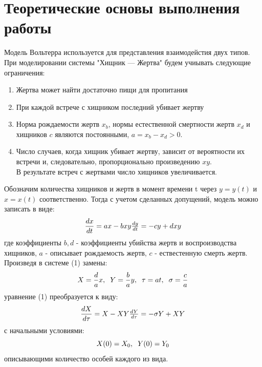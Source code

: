\documentclass[a4paper,12pt]{article}
\begin{document}
\section{Теоретические основы выполнения работы}
\hspace{0.5cm} Модель Вольтерра используется для представления взаимодейстия двух типов. 
При моделировании системы "Хищник --- Жертва" будем учиывать следующие ограничения:
\begin{enumerate}
    \item Жертва может найти достаточно пищи для пропитания
    \item При каждой встрече с хищником последний убивает жертву
    \item Норма рождаемости жертв $x_b$, нормы естественной смертности жертв $x_d$ и\\
    хищников $c$ являются постоянными, $a = x_b - x_d > 0$.
    \item Число случаев, когда хищник убивает жертву, зависит от вероятности их
    встречи и, следовательно, пропорционально произведению $xy$. \\
    В результате встреч с жертвами число хищников увеличивается.
\end{enumerate}

Обозначим количества хищников и жертв в момент времени t через $y = y(t)$ и $x = x(t)$
соответственно. Тогда с учетом сделанных допущений, модель можно записать в виде:
\begin{equation}
    \frac{dx}{dt} = ax - bxy $$ $$
    \frac{dy}{dt} = -cy + dxy
\end{equation}
где коэффициенты $b, d$ - коэффициенты убийства жертв и воспроизводства хищников,
$a$ - описывает рождаемость жертв, $c$ - ествестенную смерть жертв. $$ $$
Произведя в системе (1) замены:
\begin{equation*}
    X = \frac{d}{a}x, \hspace{0.2cm} Y = \frac{b}{a}y, \hspace{0.2cm} \tau = at, \hspace{0.2cm} \sigma = \frac{c}{a}
\end{equation*}
уравнение (1) преобразуется к виду:
\begin{equation}
    \frac{dX}{d\tau} = X - XY $$ $$
    \frac{dY}{d\tau} = -\sigma Y + XY
\end{equation}
с начальными условиями:
\begin{equation}
    X(0) = X_0, \hspace{0.2cm} Y(0) = Y_0
\end{equation}
описывающими количество особей каждого из вида.
\newpage
\end{document}

